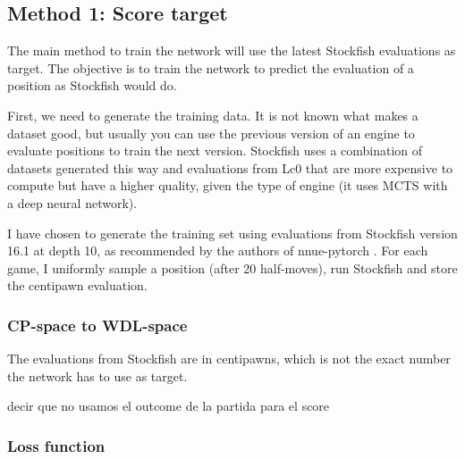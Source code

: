 

\subsection{Method 1: Score target}

The main method to train the network will use the latest Stockfish evaluations as target. The objective is to train the network to predict the evaluation of a position as Stockfish would do.

First, we need to generate the training data. It is not known what makes a dataset good, but usually you can use the previous version of an engine to evaluate positions to train the next version. Stockfish uses a combination of datasets generated this way and evaluations from Lc0 that are more expensive to compute but have a higher quality, given the type of engine (it uses MCTS with a deep neural network).

I have chosen to generate the training set using evaluations from Stockfish version 16.1 at depth 10, as recommended by the authors of nnue-pytorch \cite{nnue-pytorch}. For each game, I uniformly sample a position (after 20 half-moves), run Stockfish and store the centipawn evaluation.

\setcounter{secnumdepth}{4}
\subsubsection{CP-space to WDL-space}

The evaluations from Stockfish are in centipawns, which is not the exact number the network has to use as target.


decir que no usamos el outcome de la partida para el score


\subsubsection{Loss function}


